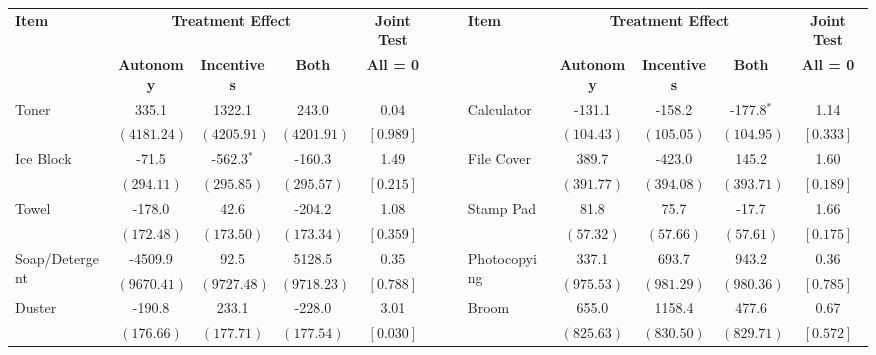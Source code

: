 \begin{tabular}{lccccclcccc}
\toprule
\multirow{2}{*}{\textbf{Item}} & \multicolumn{3}{c}{\textbf{Treatment Effect}} & \textbf{Joint Test} & $\quad$ & \multirow{2}{*}{\textbf{Item}} & \multicolumn{3}{c}{\textbf{Treatment Effect}} & \textbf{Joint Test} \\ 
 & \textbf{Autonomy} & \textbf{Incentives} & \textbf{Both} & \textbf{All = 0} & & & \textbf{Autonomy} & \textbf{Incentives} & \textbf{Both} & \textbf{All = 0} \\ 
\midrule
 \multirow{2}{*}{Toner}  &  335.1 & 1322.1 &  243.0 &   0.04 & & \multirow{2}{*}{Calculator}  & -131.1 & -158.2 & -177.8$^{*}$ &   1.14 \\ 
 & $ \left(4181.24\right) $  & $ \left(4205.91\right) $  & $ \left(4201.91\right) $  & $ \left[ 0.989\right] $  & &  & $ \left(104.43\right) $  & $ \left(105.05\right) $  & $ \left(104.95\right) $  & $ \left[ 0.333\right] $  \\ [0.25em] 
 \multirow{2}{*}{Ice Block}  &  -71.5 & -562.3$^{*}$ & -160.3 &   1.49 & & \multirow{2}{*}{File Cover}  &  389.7 & -423.0 &  145.2 &   1.60 \\ 
 & $ \left(294.11\right) $  & $ \left(295.85\right) $  & $ \left(295.57\right) $  & $ \left[ 0.215\right] $  & &  & $ \left(391.77\right) $  & $ \left(394.08\right) $  & $ \left(393.71\right) $  & $ \left[ 0.189\right] $  \\ [0.25em] 
 \multirow{2}{*}{Towel}  & -178.0 &   42.6 & -204.2 &   1.08 & & \multirow{2}{*}{Stamp Pad}  &   81.8 &   75.7 &  -17.7 &   1.66 \\ 
 & $ \left(172.48\right) $  & $ \left(173.50\right) $  & $ \left(173.34\right) $  & $ \left[ 0.359\right] $  & &  & $ \left( 57.32\right) $  & $ \left( 57.66\right) $  & $ \left( 57.61\right) $  & $ \left[ 0.175\right] $  \\ [0.25em] 
 \multirow{2}{*}{Soap/Detergent}  & -4509.9 &   92.5 & 5128.5 &   0.35 & & \multirow{2}{*}{Photocopying}  &  337.1 &  693.7 &  943.2 &   0.36 \\ 
 & $ \left(9670.41\right) $  & $ \left(9727.48\right) $  & $ \left(9718.23\right) $  & $ \left[ 0.788\right] $  & &  & $ \left(975.53\right) $  & $ \left(981.29\right) $  & $ \left(980.36\right) $  & $ \left[ 0.785\right] $  \\ [0.25em] 
 \multirow{2}{*}{Duster}  & -190.8 &  233.1 & -228.0 &   3.01 & & \multirow{2}{*}{Broom}  &  655.0 & 1158.4 &  477.6 &   0.67 \\ 
 & $ \left(176.66\right) $  & $ \left(177.71\right) $  & $ \left(177.54\right) $  & $ \left[ 0.030\right] $  & &  & $ \left(825.63\right) $  & $ \left(830.50\right) $  & $ \left(829.71\right) $  & $ \left[ 0.572\right] $  \\ [0.25em] 

\end{tabular}
